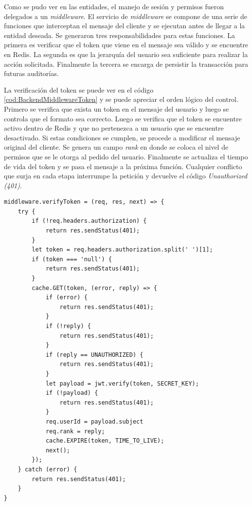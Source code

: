 Como se pudo ver en las entidades, el manejo de sesión y permisos fueron delegados a un \emph{middleware}.
El servicio de \emph{middleware} se compone de una serie de funciones que interceptan el mensaje del cliente y se ejecutan antes de llegar a la entidad deseada.
Se generaron tres responsabilidades para estas funciones.
La primera es verificar que el token que viene en el mensaje sea válido y se encuentre en Redis.
La segunda es que la jerarquía del usuario sea suficiente para realizar la acción solicitada.
Finalmente la tercera se encarga de persistir la transacción para futuras auditorías.

La verificación del token se puede ver en el código \ref{cod:BackendMiddlewareToken} y se puede apreciar el orden lógico del control.
Primero se verifica que exista un token en el mensaje del usuario y luego se controla que el formato sea correcto.
Luego se verifica que el token se encuentre activo dentro de Redis y que no pertenezca a un usuario que se encuentre desactivado.
Si estas condiciones se cumplen, se procede a modificar el mensaje original del cliente.
Se genera un campo \emph{rank} en donde se coloca el nivel de permisos que se le otorga al pedido del usuario.
Finalmente se actualiza el tiempo de vida del token y se pasa el mensaje a la próxima función.
Cualquier conflicto que surja en cada etapa interrumpe la petición y devuelve el código \emph{Unauthorized (401)}.

\begin{lstlisting}[label=cod:BackendMiddlewareToken,caption=Verificación de token]
middleware.verifyToken = (req, res, next) => {
    try {
        if (!req.headers.authorization) {
            return res.sendStatus(401);
        }
        let token = req.headers.authorization.split(' ')[1];
        if (token === 'null') {
            return res.sendStatus(401);
        }
        cache.GET(token, (error, reply) => {
            if (error) {
                return res.sendStatus(401);
            }
            if (!reply) {
                return res.sendStatus(401);
            }
            if (reply == UNAUTHORIZED) {
                return res.sendStatus(401);
            }
            let payload = jwt.verify(token, SECRET_KEY);
            if (!payload) {
                return res.sendStatus(401);
            }
            req.userId = payload.subject
            req.rank = reply;
            cache.EXPIRE(token, TIME_TO_LIVE);
            next();
        });
    } catch (error) {
        return res.sendStatus(401);
    }
}
\end{lstlisting}

